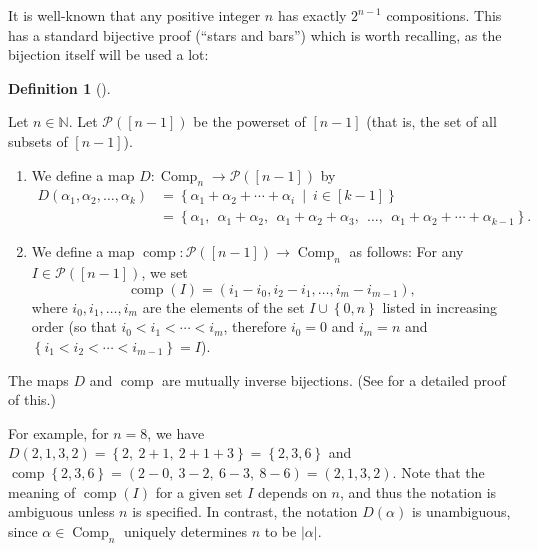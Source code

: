 \documentclass[numbers=enddot,12pt,final,onecolumn,notitlepage]{scrartcl}%
\theoremstyle{definition}
\newtheorem{defi}[theo]{Definition}
\newenvironment{definition}[1][]
{\begin{defi}[#1]\begin{leftbar}}
{\end{leftbar}\end{defi}}
\begin{document}
It is well-known that any positive integer $n$ has exactly $2^{n-1}$
compositions. This has a standard bijective proof (\textquotedblleft stars and
bars\textquotedblright) which is worth recalling, as the bijection itself will
be used a lot:

\begin{definition}
\label{def.comps.D-comp}Let $n\in\mathbb{N}$. Let $\mathcal{P}\left(  \left[
n-1\right]  \right)  $ be the powerset of $\left[  n-1\right]  $ (that is, the
set of all subsets of $\left[  n-1\right]  $).

\begin{enumerate}
\item[\textbf{(a)}] We define a map $D:\operatorname*{Comp}\nolimits_{n}%
\rightarrow\mathcal{P}\left(  \left[  n-1\right]  \right)  $ by
\begin{align*}
D\left(  \alpha_{1},\alpha_{2},\ldots,\alpha_{k}\right)   &  =\left\{
\alpha_{1}+\alpha_{2}+\cdots+\alpha_{i}\ \mid\ i\in\left[  k-1\right]
\right\} \\
&  =\left\{  \alpha_{1},\ \ \alpha_{1}+\alpha_{2},\ \ \alpha_{1}+\alpha
_{2}+\alpha_{3},\ \ \ldots,\ \ \alpha_{1}+\alpha_{2}+\cdots+\alpha
_{k-1}\right\}  .
\end{align*}


\item[\textbf{(b)}] We define a map $\operatorname*{comp}:\mathcal{P}\left(
\left[  n-1\right]  \right)  \rightarrow\operatorname*{Comp}\nolimits_{n}$ as
follows: For any $I\in\mathcal{P}\left(  \left[  n-1\right]  \right)  $, we
set%
\[
\operatorname*{comp}\left(  I\right)  =\left(  i_{1}-i_{0},i_{2}-i_{1}%
,\ldots,i_{m}-i_{m-1}\right)  ,
\]
where $i_{0},i_{1},\ldots,i_{m}$ are the elements of the set $I\cup\left\{
0,n\right\}  $ listed in increasing order (so that $i_{0}<i_{1}<\cdots<i_{m}$,
therefore $i_{0}=0$ and $i_{m}=n$ and $\left\{  i_{1}<i_{2}<\cdots
<i_{m-1}\right\}  =I$).
\end{enumerate}

The maps $D$ and $\operatorname*{comp}$ are mutually inverse bijections. (See
\cite[detailed version, Proposition 10.17]{Grinbe15} for a detailed proof of this.)
\end{definition}

For example, for $n=8$, we have $D\left(  2,1,3,2\right)  =\left\{
2,\ 2+1,\ 2+1+3\right\}  =\left\{  2,3,6\right\}  $ and $\operatorname*{comp}%
\left\{  2,3,6\right\}  =\left(  2-0,\ 3-2,\ 6-3,\ 8-6\right)  =\left(
2,1,3,2\right)  $. Note that the meaning of $\operatorname*{comp}\left(
I\right)  $ for a given set $I$ depends on $n$, and thus the notation is
ambiguous unless $n$ is specified. In contrast, the notation $D\left(
\alpha\right)  $ is unambiguous, since $\alpha\in\operatorname*{Comp}%
\nolimits_{n}$ uniquely determines $n$ to be $\left\vert \alpha\right\vert $.
\end{document}
